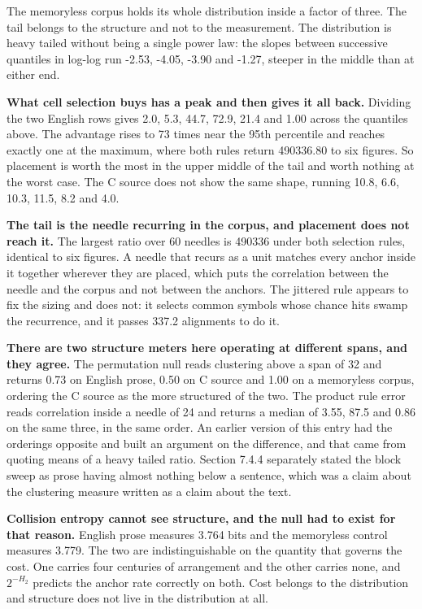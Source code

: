 The memoryless corpus holds its whole distribution inside a factor of three. The tail belongs to the structure and not to the measurement. The distribution is heavy tailed without being a single power law: the slopes between successive quantiles in log-log run -2.53, -4.05, -3.90 and -1.27, steeper in the middle than at either end.

\textbf{What cell selection buys has a peak and then gives it all back.} Dividing the two English rows gives 2.0, 5.3, 44.7, 72.9, 21.4 and 1.00 across the quantiles above. The advantage rises to 73 times near the 95th percentile and reaches exactly one at the maximum, where both rules return 490336.80 to six figures. So placement is worth the most in the upper middle of the tail and worth nothing at the worst case. The C source does not show the same shape, running 10.8, 6.6, 10.3, 11.5, 8.2 and 4.0.

\textbf{The tail is the needle recurring in the corpus, and placement does not reach it.} The largest ratio over 60 needles is 490336 under both selection rules, identical to six figures. A needle that recurs as a unit matches every anchor inside it together wherever they are placed, which puts the correlation between the needle and the corpus and not between the anchors. The jittered rule appears to fix the sizing and does not: it selects common symbols whose chance hits swamp the recurrence, and it passes 337.2 alignments to do it.

\textbf{There are two structure meters here operating at different spans, and they agree.} The permutation null reads clustering above a span of 32 and returns 0.73 on English prose, 0.50 on C source and 1.00 on a memoryless corpus, ordering the C source as the more structured of the two. The product rule error reads correlation inside a needle of 24 and returns a median of 3.55, 87.5 and 0.86 on the same three, in the same order. An earlier version of this entry had the orderings opposite and built an argument on the difference, and that came from quoting means of a heavy tailed ratio. Section 7.4.4 separately stated the block sweep as prose having almost nothing below a sentence, which was a claim about the clustering measure written as a claim about the text.

\textbf{Collision entropy cannot see structure, and the null had to exist for that reason.} English prose measures 3.764 bits and the memoryless control measures 3.779. The two are indistinguishable on the quantity that governs the cost. One carries four centuries of arrangement and the other carries none, and \(2^{-H_2}\) predicts the anchor rate correctly on both. Cost belongs to the distribution and structure does not live in the distribution at all.

